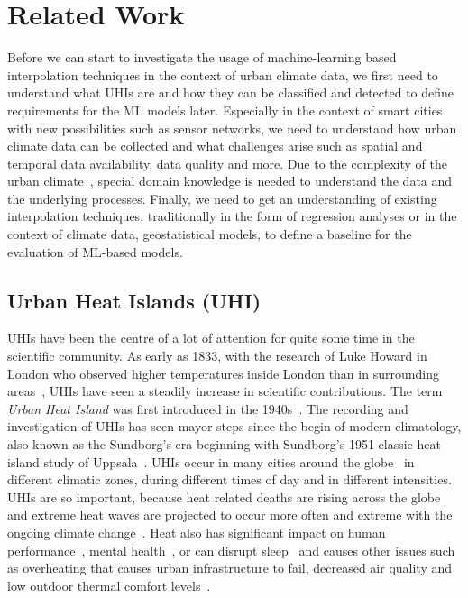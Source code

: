 \chapter{Related Work}
\label{chap:Related Work}

Before we can start to investigate the usage of machine-learning based interpolation techniques in the context of urban climate data, we first need to understand what UHIs are and how they can be classified and detected to define requirements for the ML models later. Especially in the context of smart cities with new possibilities such as sensor networks, we need to understand how urban climate data can be collected and what challenges arise such as spatial and temporal data availability, data quality and more. Due to the complexity of the urban climate~\cite{oke2006guideline}, special domain knowledge is needed to understand the data and the underlying processes.
Finally, we need to get an understanding of existing interpolation techniques, traditionally in the form of regression analyses or in the context of climate data, geostatistical models, to define a baseline for the evaluation of ML-based models.

\section{Urban Heat Islands (UHI)}

UHIs have been the centre of a lot of attention for quite some time in the scientific community. As early as 1833, with the research of Luke Howard in London who observed higher temperatures inside London than in surrounding areas~\cite{howard1833climate}, UHIs have seen a steadily increase in scientific contributions. The term \textit{Urban Heat Island} was first introduced in the 1940s~\cite{balchin1947micro}. The recording and investigation of UHIs has seen mayor steps since the begin of modern climatology, also known as the Sundborg's era beginning with Sundborg's 1951 classic heat island study of Uppsala~\cite{sundborg1951climatological}. UHIs occur in many cities around the globe~\cite{peng2012surface} in different climatic zones, during different times of day and in different intensities.\\
UHIs are so important, because heat related deaths are rising across the globe~\cite{kovats2008heat} and extreme heat waves are projected to occur more often and extreme with the ongoing climate change~\cite{lorenz2019detection}. Heat also has significant impact on human performance~\cite{kjellstrom2016heat}, mental health~\cite{obradovich2018empirical}, or can disrupt sleep~\cite{obradovich2017nighttime} and causes other issues such as overheating that causes urban infrastructure to fail, decreased air quality and low outdoor thermal comfort levels~\cite{stone2013climate}.

